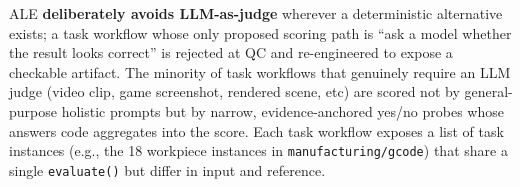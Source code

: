 ALE \textbf{deliberately avoids LLM-as-judge} wherever a deterministic alternative exists; a task workflow whose only proposed scoring path is ``ask a model whether the result looks correct'' is rejected at QC and re-engineered to expose a checkable artifact. The minority of task workflows that genuinely require an LLM judge (video clip, game screenshot, rendered scene, etc) are scored not by general-purpose holistic prompts but by narrow, evidence-anchored yes/no probes whose answers code aggregates into the score. Each task workflow exposes a list of task instances (e.g., the 18 workpiece instances in \texttt{manufacturing/gcode}) that share a single \texttt{evaluate()} but differ in input and reference.
